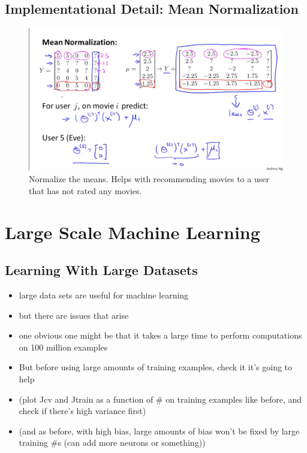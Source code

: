 \documentclass[]{article}
\begin{document}
	\subsection{Implementational Detail: Mean Normalization}
			\begin{figure}[ht!]
				\includegraphics[width= 1.5\textwidth,center]{Mean_Normalization.png}
				\caption{Normalize the means. Helps with recommending movies to a user that has not rated any movies.}
			\end{figure}

\section{Large Scale Machine Learning}

	\subsection{Learning With Large Datasets}
		\begin{itemize}
			\item large data sets are useful for machine learning
			\item but there are issues that arise
			\item one obvious one might be that it takes a large time to perform computations on 100 million examples
			\item But before using large amounts of training examples, check it it's going to help
			\item (plot Jcv and Jtrain as a function of \# on training examples like before, and check if there's high variance first)
			\item (and as before, with high bias, large amounts of bias won't be fixed by large training \#s (can add more neurons or something))
			
		\end{itemize}
		
\end{document}
